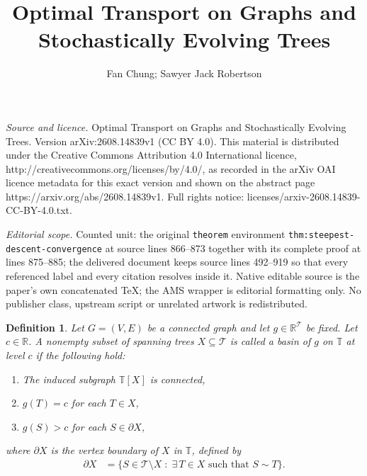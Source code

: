 \documentclass[10pt,a4paper]{amsart}
\newcommand{\setoftrees}{{\mathcal{T}}}
\newcommand{\stategraph}{{\mathbb{T}}}
\newtheorem{definition}[theorem]{Definition}
\begin{document}
\title[Optimal Transport on Graphs and Stochastically Evolving Tree]{Optimal Transport on Graphs and Stochastically Evolving Trees}
\author{Fan Chung; Sawyer Jack Robertson}
\date{}
\maketitle
\noindent\emph{Source and licence.} Optimal Transport on Graphs and Stochastically Evolving Trees. Version arXiv:2608.14839v1 (CC BY 4.0). This material is distributed under the Creative Commons Attribution 4.0 International licence, http://creativecommons.org/licenses/by/4.0/, as recorded in the arXiv OAI licence metadata for this exact version and shown on the abstract page https://arxiv.org/abs/2608.14839v1. Full rights notice: licenses/arxiv-2608.14839-CC-BY-4.0.txt.\par\smallskip
\noindent\textit{Editorial scope.} Counted unit: the original \texttt{theorem} environment \texttt{thm:steepest-descent-convergence} at source lines 866--873 together with its complete proof at lines 875--885; the delivered document keeps source lines 492--919 so that every referenced label and every citation resolves inside it. Native editable source is the paper's own concatenated TeX; the AMS wrapper is editorial formatting only. No publisher class, upstream script or unrelated artwork is redistributed.
    \begin{definition}\label{def:basin}
        Let $G=(V,E)$ be a connected graph and let $g\in\mathbb{R}^{\setoftrees}$ be fixed. Let $c\in\mathbb{R}$. A nonempty subset of spanning trees $X\subseteq \setoftrees$ is called a \emph{basin of $g$ on $\stategraph$ at level $c$} if the following hold:
            \begin{enumerate}[label=(\roman*)]
                \item The induced subgraph $\stategraph[X]$ is connected,
                \item $g(T) = c$ for each $T\in X$,
                \item $g(S) > c$ for each $S\in\partial X$,
            \end{enumerate}
        where $\partial{X}$ is the vertex boundary of $X$ in $\stategraph$, defined by
            \begin{align*}
                \partial X &= \{S\in\setoftrees\setminus X \;:\; \exists\, T\in X \text{ such that } S\sim T\}.
            \end{align*}
    \end{definition}
\end{document}
